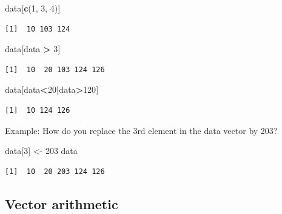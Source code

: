 \documentclass[
]{book}
\newenvironment{Shaded}{\begin{snugshade}}{\end{snugshade}}
\newcommand{\DecValTok}[1]{\textcolor[rgb]{0.00,0.00,0.81}{#1}}
\newcommand{\KeywordTok}[1]{\textcolor[rgb]{0.13,0.29,0.53}{\textbf{#1}}}
\newcommand{\NormalTok}[1]{#1}
\newcommand{\OperatorTok}[1]{\textcolor[rgb]{0.81,0.36,0.00}{\textbf{#1}}}
\newcommand{\StringTok}[1]{\textcolor[rgb]{0.31,0.60,0.02}{#1}}
\begin{document}
\begin{Shaded}
\begin{Highlighting}[]
\NormalTok{data[}\KeywordTok{c}\NormalTok{(}\DecValTok{1}\NormalTok{, }\DecValTok{3}\NormalTok{, }\DecValTok{4}\NormalTok{)]}
\end{Highlighting}
\end{Shaded}

\begin{verbatim}
[1]  10 103 124
\end{verbatim}

\begin{Shaded}
\begin{Highlighting}[]
\NormalTok{data[data }\OperatorTok{>}\StringTok{ }\DecValTok{3}\NormalTok{]}
\end{Highlighting}
\end{Shaded}

\begin{verbatim}
[1]  10  20 103 124 126
\end{verbatim}

\begin{Shaded}
\begin{Highlighting}[]
\NormalTok{data[data}\OperatorTok{<}\DecValTok{20}\OperatorTok{|}\NormalTok{data}\OperatorTok{>}\DecValTok{120}\NormalTok{]}
\end{Highlighting}
\end{Shaded}

\begin{verbatim}
[1]  10 124 126
\end{verbatim}

Example: How do you replace the 3rd element in the data vector by 203?

\begin{Shaded}
\begin{Highlighting}[]
\NormalTok{data[}\DecValTok{3}\NormalTok{] <-}\StringTok{ }\DecValTok{203}
\NormalTok{data}
\end{Highlighting}
\end{Shaded}

\begin{verbatim}
[1]  10  20 203 124 126
\end{verbatim}

\hypertarget{vector-arithmetic}{%
\subsection{Vector arithmetic}\label{vector-arithmetic}}
\end{document}
